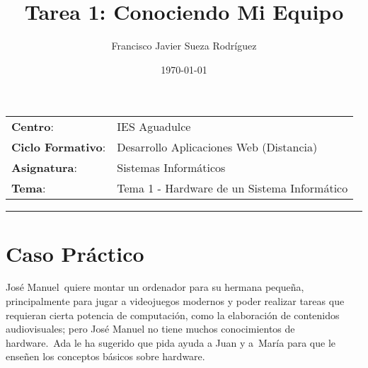 


\title{
\vspace{10ex}
\normalfont \normalsize
\Huge \textbf{Tarea 1: Conociendo Mi Equipo}
}
\author{Francisco Javier Sueza Rodríguez}
\date{\normalsize\today}



\maketitle

\thispagestyle{empty}

\vspace{75ex}

\begin{center}
    \begin{tabular}{l l}
        \textbf{Centro}: & IES Aguadulce \\
        \textbf{Ciclo Formativo}: & Desarrollo Aplicaciones Web (Distancia)\\
        \textbf{Asignatura}: & Sistemas Informáticos\\
        \textbf{Tema}: & Tema 1 -  Hardware de un Sistema Informático\\
    \end{tabular}
\end{center}

\newpage

\tableofcontents

\vspace{15ex}

\hrule

\vspace{10ex}

\listoffigures

\newpage

\section{Caso Práctico}
José Manuel quiere montar un ordenador para su hermana pequeña, principalmente para jugar a videojuegos modernos y poder realizar tareas que requieran cierta potencia de computación, como la elaboración de contenidos audiovisuales; pero José Manuel no tiene muchos conocimientos de hardware. Ada le ha sugerido que pida ayuda a Juan y a María para que le enseñen los conceptos básicos sobre hardware.

